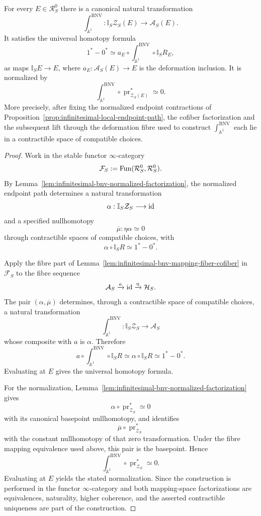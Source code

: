 \begin{theorem}
\label{thm:infinitesimal-universal-integration}
For every $E\in\mathcal R_S^0$ there is a canonical natural transformation
\[
    \boxed{
    \int_{\mathbb A^1}^{\mathrm{BNV}}:
    \mathbb I_S\mathcal Z_S(E)
    \longrightarrow
    \mathcal A_S(E).
    }
\]
It satisfies the universal homotopy formula
\[
    \boxed{
    1^*-0^*
    \simeq
    a_E
    \circ
    \int_{\mathbb A^1}^{\mathrm{BNV}}
    \circ
    \mathbb I_SR_E,
    }
\]
as maps $\mathbb I_SE\to E$, where
$a_E:\mathcal A_S(E)\to E$ is the deformation inclusion.  It is normalized
by
\[
    \int_{\mathbb A^1}^{\mathrm{BNV}}
    \circ
    \operatorname{pr}^*_{\mathcal Z_S(E)}
    \simeq0.
\]
More precisely, after fixing the normalized endpoint contractions of
Proposition~\ref{prop:infinitesimal-local-endpoint-path}, the cofiber
factorization and the subsequent lift through the deformation fibre used to
construct $\int_{\mathbb A^1}^{\mathrm{BNV}}$ each lie in a contractible space of compatible
choices.
\end{theorem}

\begin{proof}
Work in the stable functor $\infty$-category
\[
    \mathcal F_S
    :=
    \operatorname{Fun}(\mathcal R_S^0,\mathcal R_S^0).
\]
By Lemma~\ref{lem:infinitesimal-bnv-normalized-factorization}, the normalized
endpoint path determines a natural transformation
\[
    \alpha:
    \mathbb I_S\mathcal Z_S
    \longrightarrow
    \operatorname{id}
\]
and a specified nullhomotopy
\[
    \overline\mu:
    \eta\alpha\simeq0
\]
through contractible spaces of compatible choices, with
\[
    \alpha\circ\mathbb I_SR
    \simeq
    1^*-0^*.
\]

Apply the fibre part of
Lemma~\ref{lem:infinitesimal-bnv-mapping-fiber-cofiber} in $\mathcal F_S$ to
the fibre sequence
\[
    \mathcal A_S
    \xrightarrow{a}
    \operatorname{id}
    \xrightarrow{\eta}
    \mathcal H_S.
\]
The pair $(\alpha,\overline\mu)$ determines, through a contractible space of
compatible choices, a natural transformation
\[
    \int_{\mathbb A^1}^{\mathrm{BNV}}:
    \mathbb I_S\mathcal Z_S
    \longrightarrow
    \mathcal A_S
\]
whose composite with $a$ is $\alpha$.  Therefore
\[
    a\circ
    \int_{\mathbb A^1}^{\mathrm{BNV}}
    \circ
    \mathbb I_SR
    \simeq
    \alpha\circ\mathbb I_SR
    \simeq
    1^*-0^*.
\]
Evaluating at $E$ gives the universal homotopy formula.

For the normalization, Lemma~\ref{lem:infinitesimal-bnv-normalized-factorization}
gives
\[
    \alpha\circ\operatorname{pr}^*_{\mathcal Z_S}
    \simeq0
\]
with its canonical basepoint nullhomotopy, and identifies
\[
    \overline\mu\circ\operatorname{pr}^*_{\mathcal Z_S}
\]
with the constant nullhomotopy of that zero transformation.  Under the fibre
mapping equivalence used above, this pair is the basepoint.  Hence
\[
    \int_{\mathbb A^1}^{\mathrm{BNV}}
    \circ
    \operatorname{pr}^*_{\mathcal Z_S}
    \simeq0.
\]
Evaluating at $E$ yields the stated normalization.  Since the construction is
performed in the functor $\infty$-category and both mapping-space
factorizations are equivalences, naturality, higher coherence, and the
asserted contractible uniqueness are part of the construction.
\end{proof}

